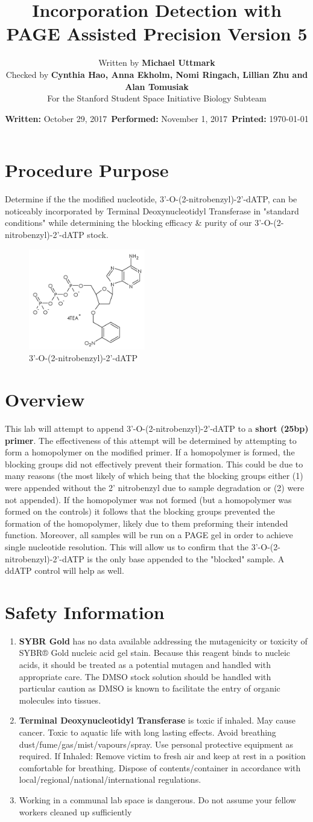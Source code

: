 \documentclass[letterpaper]{article}
\title{\BdATP{} Incorporation Detection with PAGE Assisted Precision Version 5} %
\author{Written by \textbf{Michael Uttmark}\\ %
		Checked by \textbf{Cynthia Hao, Anna Ekholm, Nomi Ringach, Lillian Zhu and Alan Tomusiak}\\ %
        For the Stanford Student Space Initiative Biology Subteam}
\date{\textbf{Written:} October 29, 2017 \,\textbf{Performed:} November 1, 2017 \,\textbf{Printed:} \today{}}
\newenvironment{safety}{%
\begin{tcolorbox}[width=\textwidth, colframe=safetyFrame, arc=1.5mm]
}%
{\end{tcolorbox}}
\newcommand{\tdt}{Terminal Deoxynucleotidyl Transferase}
\newcommand{\BdATP}{3'-O-(2-nitrobenzyl)-2'-dATP}
\newcommand{\SYBRGOLD}{\item{\textbf{SYBR Gold} has no data available addressing the mutagenicity or toxicity of SYBR® Gold nucleic acid gel stain. Because this reagent binds to nucleic acids, it should be treated as a potential mutagen and handled with appropriate care. The DMSO stock solution should be handled with particular caution as DMSO is known to facilitate the entry of organic molecules into tissues.\cite{sybrGold}}}
\newcommand{\tdtSafety}{\item{\textbf{\tdt{}} is toxic if inhaled. May cause cancer. Toxic to aquatic life with long lasting effects. Avoid breathing dust/fume/gas/mist/vapours/spray. Use personal protective equipment as required. If Inhaled: Remove victim to fresh air and keep at rest in a position comfortable for breathing. Dispose of contents/container in accordance with local/regional/national/international regulations.\cite{Invitrogen2002}}}
\begin{document}
\maketitle
\section{Procedure Purpose} %
Determine if the the modified nucleotide, \BdATP{}, can be noticeably incorporated by \tdt{} in "standard conditions" while determining the blocking efficacy \& purity of our \BdATP{} stock.
\begin{figure}[ht]
\centering
\includegraphics[width=2in]{./resources/BdATP-Structure.png}
\caption{\BdATP{}}
\label{bdatp}
\end{figure}
\section{Overview} %
This lab will attempt to append \BdATP{} to a \textbf{short (25bp) primer}. The effectiveness of this attempt will be determined by attempting to form a homopolymer on the modified primer. If a homopolymer is formed, the blocking groups did not effectively prevent their formation. This could be due to many reasons (the most likely of which being that the blocking groups either (1) were appended without the 2' nitrobenzyl due to sample degradation or (2) were not appended). If the homopolymer was not formed (but a homopolymer was formed on the controls) it follows that the blocking groups prevented the formation of the homopolymer, likely due to them preforming their intended function. Moreover, all samples will be run on a PAGE gel in order to achieve single nucleotide resolution. This will allow us to confirm that the \BdATP{} is the only base appended to the "blocked" sample. A ddATP control will help as well.

\section{Safety Information}
\begin{safety}
\begin{enumerate}
\SYBRGOLD{} %
\tdtSafety{}
\item{Working in a communal lab space is dangerous. Do not assume your fellow workers cleaned up sufficiently}
\end{enumerate}
\end{safety}
\end{document}
